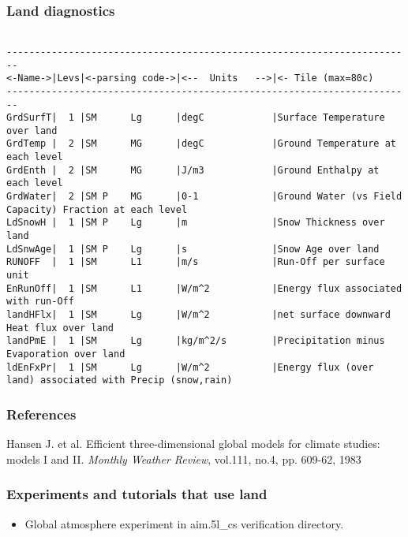 \subsubsection{Land diagnostics}
\label{sec:pkg:land:diagnostics}

{\footnotesize
\begin{verbatim}

------------------------------------------------------------------------
<-Name->|Levs|<-parsing code->|<--  Units   -->|<- Tile (max=80c) 
------------------------------------------------------------------------
GrdSurfT|  1 |SM      Lg      |degC            |Surface Temperature over land
GrdTemp |  2 |SM      MG      |degC            |Ground Temperature at each level
GrdEnth |  2 |SM      MG      |J/m3            |Ground Enthalpy at each level
GrdWater|  2 |SM P    MG      |0-1             |Ground Water (vs Field Capacity) Fraction at each level
LdSnowH |  1 |SM P    Lg      |m               |Snow Thickness over land
LdSnwAge|  1 |SM P    Lg      |s               |Snow Age over land
RUNOFF  |  1 |SM      L1      |m/s             |Run-Off per surface unit
EnRunOff|  1 |SM      L1      |W/m^2           |Energy flux associated with run-Off
landHFlx|  1 |SM      Lg      |W/m^2           |net surface downward Heat flux over land
landPmE |  1 |SM      Lg      |kg/m^2/s        |Precipitation minus Evaporation over land
ldEnFxPr|  1 |SM      Lg      |W/m^2           |Energy flux (over land) associated with Precip (snow,rain)
\end{verbatim}
}

\subsubsection{References}

Hansen J. et al. Efficient three-dimensional global models for climate
studies: models I and II. \emph{Monthly Weather Review}, vol.111, no.4, pp.
609-62, 1983

\subsubsection{Experiments and tutorials that use land}
\label{sec:pkg:land:experiments}

\begin{itemize}
\item{Global atmosphere experiment in aim.5l\_cs verification directory. }
\end{itemize}

